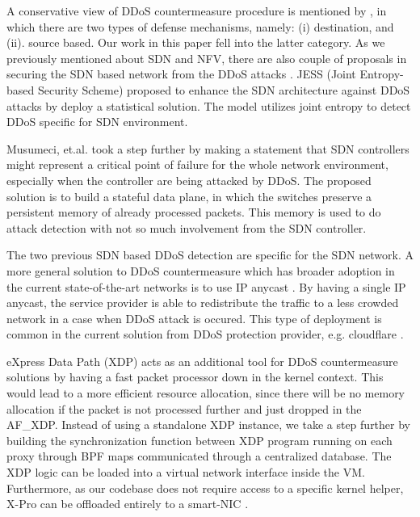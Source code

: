 \documentclass[sigplan,screen]{acmart}
\begin{document}
A conservative view of DDoS countermeasure procedure is mentioned by \cite{6489876}, in which there are two types of defense mechanisms, namely: (i) destination, and (ii). source based. Our work in this paper fell into the latter category. As we previously mentioned about SDN and NFV, there are also couple of proposals in securing the SDN based network from the DDoS attacks \cite{10.1145/3164541.3164562} \cite{10.1145/3360468.3368183}. JESS (Joint Entropy-based Security Scheme) \cite{8466805} proposed to enhance the SDN architecture against DDoS attacks by deploy a statistical solution. The model utilizes joint entropy to detect DDoS specific for SDN environment. 

Musumeci, et.al. \cite{9149043} took a step further by making a statement that SDN controllers might represent a critical point of failure for the whole network environment, especially when the controller are being attacked by DDoS. The proposed solution is to build a stateful data plane, in which the switches preserve a persistent memory of already processed packets. This memory is used to do attack detection with not so much involvement from the SDN controller.

The two previous SDN based DDoS detection are specific for the SDN network. A more general solution to DDoS countermeasure which has broader adoption in the current state-of-the-art networks is to use IP anycast \cite{rizvi2020anycast} \cite{10.1145/2987443.2987446}. By having a single IP anycast, the service provider is able to redistribute the traffic to a less crowded network in a case when DDoS attack is occured. This type of deployment is common in the current solution from DDoS protection provider, e.g. cloudflare \cite{anycast_cf}.

eXpress Data Path (XDP) \cite{10.1145/3281411.3281443} acts as an additional tool for DDoS countermeasure solutions by having a fast packet processor down in the kernel context. This would lead to a more efficient resource allocation, since there will be no memory allocation if the packet is not processed further and just dropped in the AF\_XDP. Instead of using a standalone XDP instance, we take a step further by building the synchronization function between XDP program running on each proxy through BPF maps communicated through a centralized database. The XDP logic can be loaded into a virtual network interface inside the VM. Furthermore, as our codebase does not require access to a specific kernel helper, X-Pro can be offloaded entirely to a smart-NIC \cite{8789414}.
\end{document}
